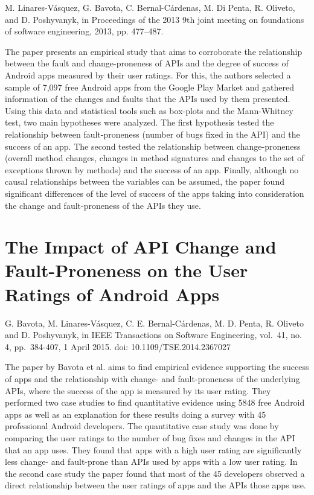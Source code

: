 \documentclass[]{book}
\begin{document}
M. Linares-Vásquez, G. Bavota, C. Bernal-Cárdenas, M. Di Penta, R.
Oliveto, and D. Poshyvanyk, in Proceedings of the 2013 9th joint meeting
on foundations of software engineering, 2013, pp. 477--487.

The paper presents an empirical study that aims to corroborate the
relationship between the fault and change-proneness of APIs and the
degree of success of Android apps measured by their user ratings. For
this, the authors selected a sample of 7,097 free Android apps from the
Google Play Market and gathered information of the changes and faults
that the APIs used by them presented. Using this data and statistical
tools such as box-plots and the Mann-Whitney test, two main hypotheses
were analyzed. The first hypothesis tested the relationship between
fault-proneness (number of bugs fixed in the API) and the success of an
app. The second tested the relationship between change-proneness
(overall method changes, changes in method signatures and changes to the
set of exceptions thrown by methods) and the success of an app. Finally,
although no causal relationships between the variables can be assumed,
the paper found significant differences of the level of success of the
apps taking into consideration the change and fault-proneness of the
APIs they use.

\section{The Impact of API Change and Fault-Proneness on the User
Ratings of Android
Apps}\label{the-impact-of-api-change-and-fault-proneness-on-the-user-ratings-of-android-apps}

G. Bavota, M. Linares-Vásquez, C. E. Bernal-Cárdenas, M. D. Penta, R.
Oliveto and D. Poshyvanyk, in IEEE Transactions on Software Engineering,
vol.~41, no. 4, pp.~384-407, 1 April 2015. doi: 10.1109/TSE.2014.2367027

The paper by Bavota et al. aims to find empirical evidence supporting
the success of apps and the relationship with change- and
fault-proneness of the underlying APIs, where the success of the app is
measured by its user rating. They performed two case studies to find
quantitative evidence using 5848 free Android apps as well as an
explanation for these results doing a survey with 45 professional
Android developers. The quantitative case study was done by comparing
the user ratings to the number of bug fixes and changes in the API that
an app uses. They found that apps with a high user rating are
significantly less change- and fault-prone than APIs used by apps with a
low user rating. In the second case study the paper found that most of
the 45 developers observed a direct relationship between the user
ratings of apps and the APIs those apps use.
\end{document}
